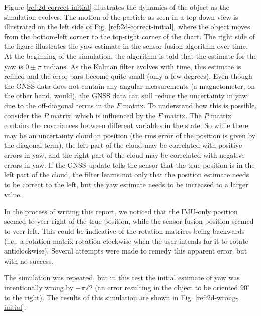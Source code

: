 \documentclass[10pt]{article}
\begin{document}
Figure \ref{ref:2d-correct-initial} illustrates the dynamics of the object as the simulation evolves. The motion of the particle as seen in a top-down view is illustrated on the left side of Fig. \ref{ref:2d-correct-initial}, where the object moves from the bottom-left corner to the top-right corner of the chart. The right side of the figure illustrates the yaw estimate in the sensor-fusion algorithm over time. At the beginning of the simulation, the algorithm is told that the estimate for the yaw is $0 \pm \pi$ radians. As the Kalman filter evolves with time, this estimate is refined and the error bars become quite small (only a few degrees). Even though the GNSS data does not contain any angular measurements (a magnetometer, on the other hand, would), the GNSS data can still reduce the uncertainty in yaw due to the off-diagonal terms in the $F$ matrix. To understand how this is possible, consider the $P$ matrix, which is influenced by the $F$ matrix. The $P$ matrix contains the covariances between different variables in the state. So while there may be an uncertainty cloud in position (the rms error of the position is given by the diagonal term), the left-part of the cloud may be correlated with positive errors in yaw, and the right-part of the cloud may be correlated with negative errors in yaw. If the GNSS update tells the sensor that the true position is in the left part of the cloud, the filter learns not only that the position estimate needs to be correct to the left, but the yaw estimate needs to be increased to a larger value.

In the process of writing this report, we noticed that the IMU-only position seemed to veer right of the true position, while the sensor-fusion position seemed to veer left. This could be indicative of the rotation matrices being backwards (i.e., a rotation matrix rotation clockwise when the user intends for it to rotate anticlockwise). Several attempts were made to remedy this apparent error, but with no success.

The simulation was repeated, but in this test the initial estimate of yaw was intentionally wrong by $-\pi/2$ (an error resulting in the object to be oriented $90^\circ$ to the right). The results of this simulation are shown in Fig. \ref{ref:2d-wrong-initial}.
\end{document}
